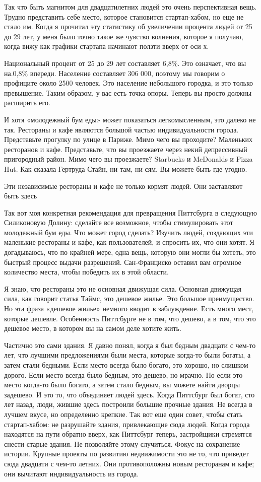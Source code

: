 \documentclass[ebook,12pt,oneside,openany]{memoir}
\begin{document}
Так что быть магнитом для двадцатилетних людей это очень перспективная
вещь. Трудно представить себе место, которое становится стартап-хабом,
но еще не стало им. Когда я прочитал эту статистику об увеличении
процента людей от 25 до 29 лет, у меня было точно такое же чувство
волнения, которое я получаю, когда вижу как графики стартапа начинают
ползти вверх от оси х.

Национальный процент от 25 до 29 лет составляет 6,8\%. Это означает,
что вы на.0,8\% впереди. Население составляет 306 000, поэтому мы
говорим о профиците около 2500 человек. Это население небольшого
городка, и это только превышение. Таким образом, у вас есть точка
опоры. Теперь вы просто должны расширить его.

И хотя «молодежный бум еды» может показаться легкомысленным, это
далеко не так. Рестораны и кафе являются большой частью
индивидуальности города. Представьте прогулку по улице в Париже. Мимо
чего вы проходите? Маленьких ресторанов и кафе. Представьте, что вы
проезжаете через некий депрессивный пригородный район. Мимо чего вы
проезжаете? Starbucks и McDonalds и Pizza Hut. Как сказала Гертруда
Стайн, ни там, ни сям. Вы можете быть где угодно.

Эти независимые рестораны и кафе не только кормят людей. Они
заставляют быть здесь

Так вот моя конкретная рекомендация для превращения Питтсбурга в
следующую Силиконовую Долину: сделайте все возможное, чтобы
стимулировать этот молодежный бум еды. Что может город сделать?
Изучить людей, создающих эти маленькие рестораны и кафе, как
пользователей, и спросить их, что они хотят. Я догадываюсь, что по
крайней мере, одна вещь, которую они могли бы хотеть, это быстрый
процесс выдачи разрешений. Сан-Франциско оставил вам огромное
количество места, чтобы победить их в этой области.

Я знаю, что рестораны это не основная движущая сила. Основная движущая
сила, как говорит статья Таймс, это дешевое жилье. Это большое
преимущество. Но эта фраза «дешевое жилье» немного вводит в
заблуждение. Есть много мест, которые дешевле. Особенность Питтсбурге
не в том, что дешево, а в том, что это дешевое место, в котором вы на
самом деле хотите жить.

Частично это сами здания. Я давно понял, когда я был бедным двадцати с
чем-то лет, что лучшими предложениями были места, которые когда-то
были богаты, а затем стали бедными. Если место всегда было богато, это
хорошо, но слишком дорого. Если место всегда было бедным, это дешево,
но мрачно. Но если это место когда-то было богато, а затем стало
бедным, вы можете найти дворцы задешево. И это то, что объединяет
людей здесь. Когда Питтсбург был богат, сто лет назад, люди, жившие
здесь построили большие прочные здания. Не всегда в лучшем вкусе, но
определенно крепкие. Так вот еще один совет, чтобы стать
стартап-хабом: не разрушайте здания, привлекающие сюда людей. Когда
города находятся на пути обратно вверх, как Питтсбург теперь,
застройщики стремятся снести старые здания. Не позволяйте этому
случиться. Фокус на сохранение истории. Крупные проекты по развитию
недвижимости это не то, что приведет сюда двадцати с чем-то летних.
Они противоположны новым ресторанам и кафе; они вычитают
индивидуальность из города.
\end{document}
